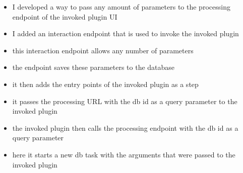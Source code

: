 \documentclass[
  a4paper,  %
  twoside,  %
  bibliography=totoc,
  headsepline,
  cleardoublepage=empty,
  parskip=half,
  draft=false
]{scrbook}
\begin{document}
\begin{itemize}
  \begin{itemize}
    \item I developed a way to pass any amount of parameters to the processing endpoint of the invoked plugin UI
    \item I added an interaction endpoint that is used to invoke the invoked plugin
    \item this interaction endpoint allows any number of parameters
    \item the endpoint saves these parameters to the database
    \item it then adds the entry points of the invoked plugin as a step
    \item it passes the processing URL with the db id as a query parameter to the invoked plugin
    \item the invoked plugin then calls the processing endpoint with the db id as a query parameter
    \item here it starts a new db task with the arguments that were passed to the invoked plugin
  \end{itemize}
\end{itemize}
\end{document}

